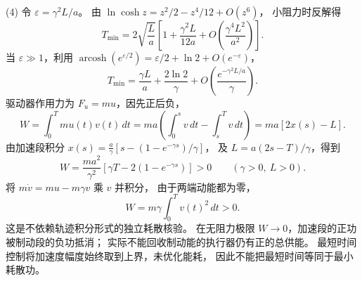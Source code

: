 (4) 令 \(\varepsilon=\gamma^2L/a\)。
由 \(\ln\cosh z=z^2/2-z^4/12+O(z^6)\)，
小阻力时反解得
\[
 \boxed{T_{\min}=2\sqrt{\frac La}
 \left[1+\frac{\gamma^2L}{12a}
 +O\!\left(\frac{\gamma^4L^2}{a^2}\right)\right]}.
\]
当 \(\varepsilon\gg1\)，利用
\(\operatorname{arcosh}(e^{\varepsilon/2})
 =\varepsilon/2+\ln2+O(e^{-\varepsilon})\)，
\[
 \boxed{T_{\min}=\frac{\gamma L}{a}
 +\frac{2\ln2}{\gamma}
 +O\!\left(\frac{e^{-\gamma^2L/a}}{\gamma}\right)}.
\]
驱动器作用力为 \(F_u=mu\)，因先正后负，
\[
 W=\int_0^T mu(t)v(t)\,dt
 =ma\left(\int_0^s v\,dt-\int_s^T v\,dt\right)
 =ma[2x(s)-L].
\]
由加速段积分
\(x(s)=\frac a\gamma[s-(1-e^{-\gamma s})/\gamma]\)，
及 \(L=a(2s-T)/\gamma\)，得到
\[
 \boxed{W=\frac{ma^2}{\gamma^2}
 \left[\gamma T-2(1-e^{-\gamma s})\right]>0}
 \qquad(\gamma>0,\ L>0).
\]
将 \(m\dot v=mu-m\gamma v\) 乘 \(v\) 并积分，
由于两端动能都为零，
\[
 \boxed{W=m\gamma\int_0^T v(t)^2\,dt>0}.
\]
这是不依赖轨迹积分形式的独立耗散核验。
在无阻力极限 \(W\to0\)，加速段的正功被制动段的负功抵消；
实际不能回收制动能的执行器仍有正的总供能。
最短时间控制将加速度幅度始终取到上界，未优化能耗，
因此不能把最短时间等同于最小耗散功。
